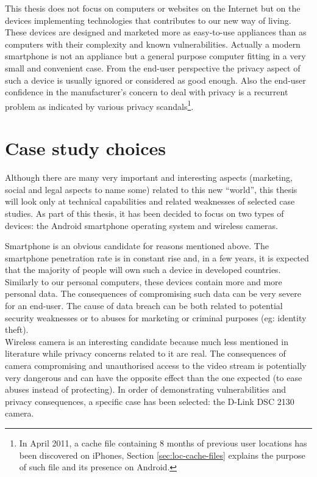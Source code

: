 This thesis does not focus on computers or websites on the Internet but on the devices implementing technologies that contributes to our new way of living.
These devices are designed and marketed more as easy-to-use appliances than as computers with their complexity and known vulnerabilities.
Actually a modern smartphone is not an appliance but a general purpose computer fitting in a very small and convenient case.
From the end-user perspective the privacy aspect of such a device is usually ignored or considered as good enough.
Also the end-user confidence in the manufacturer’s concern to deal with privacy is a recurrent problem as indicated by various privacy scandals\footnote{In April 2011, a cache file containing 8 months of previous user locations has been discovered on iPhones, Section \ref{sec:loc-cache-files} explains the purpose of such file and its presence on Android.}.

\section{Case study choices}

Although there are many very important and interesting aspects (marketing, social and legal aspects to name some) related to this new ``world'', this thesis will look only at technical capabilities and related weaknesses of selected case studies.
As part of this thesis, it has been decided to focus on two types of devices: the Android smartphone operating system and wireless cameras.


Smartphone is an obvious candidate for reasons mentioned above.
The smartphone penetration rate is in constant rise and, in a few years, it is expected that the  majority of people will own such a device in developed countries.
Similarly to our personal computers, these devices contain more and more personal data.
The consequences of compromising such data can be very severe for an end-user.
The cause of data breach can be both related to potential security weaknesses or to abuses for marketing or criminal purposes (eg: identity theft).\\

Wireless camera is an interesting candidate because much less mentioned in literature while privacy concerns related to it are real.
The consequences of camera compromising and unauthorised access to the video stream is potentially very dangerous and can have the opposite effect than the one expected (to ease abuses instead of protecting).
In order of demonstrating vulnerabilities and privacy consequences, a specific case has been selected: the D-Link DSC 2130 camera.

